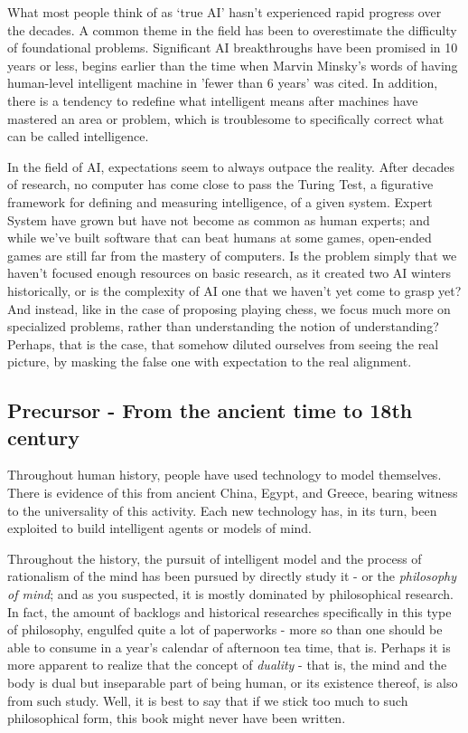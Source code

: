 What most people think of as `true AI' hasn't experienced rapid progress over the decades. A common theme in the field has been to overestimate the difficulty of foundational problems. Significant AI breakthroughs have been promised in 10 years or less, begins earlier than the time when Marvin Minsky's words of having human-level intelligent machine in 'fewer than 6 years' was cited. In addition, there is a tendency to redefine what intelligent means after machines have mastered an area or problem, which is troublesome to specifically correct what can be called intelligence. 

In the field of AI, expectations seem to always outpace the reality. After decades of research, no computer has come close to pass the Turing Test, a figurative framework for defining and measuring intelligence, of a given system. Expert System have grown but have not become as common as human experts; and while we've built software that can beat humans at some games, open-ended games are still far from the mastery of computers. Is the problem simply that we haven't focused enough resources on basic research, as it created two AI winters historically, or is the complexity of AI one that we haven't yet come to grasp yet? And instead, like in the case of proposing playing chess, we focus much more on specialized problems, rather than understanding the notion of understanding? Perhaps, that is the case, that somehow diluted ourselves from seeing the real picture, by masking the false one with expectation to the real alignment. 

\subsection{Precursor - From the ancient time to 18th century}

Throughout human history, people have used technology to model themselves. There is evidence of this from ancient China, Egypt, and Greece, bearing witness to the universality of this activity. Each new technology has, in its turn, been exploited to build intelligent agents or models of mind. 

Throughout the history, the pursuit of intelligent model and the process of rationalism of the mind has been pursued by directly study it - or the \textit{philosophy of mind}; and as you suspected, it is mostly dominated by philosophical research. In fact, the amount of backlogs and historical researches specifically in this type of philosophy, engulfed quite a lot of paperworks - more so than one should be able to consume in a year's calendar of afternoon tea time, that is. Perhaps it is more apparent to realize that the concept of \textit{duality} - that is, the mind and the body is dual but inseparable part of being human, or its existence thereof, is also from such study. Well, it is best to say that if we stick too much to such philosophical form, this book might never have been written. 

